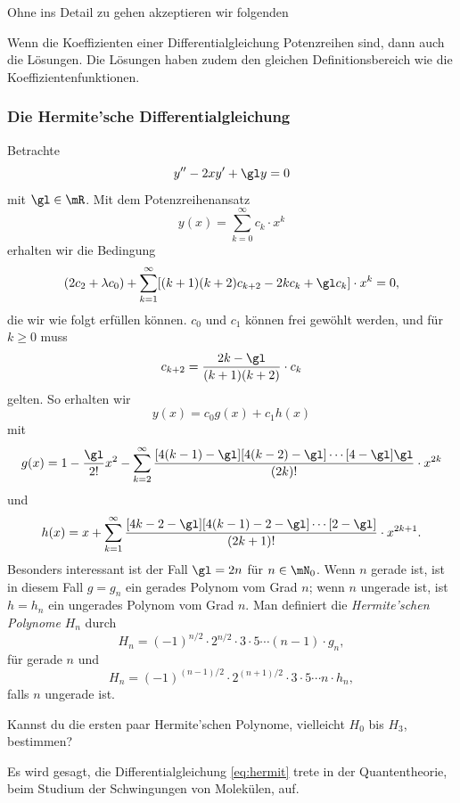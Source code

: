 \documentclass[%
11pt,%
twoside,%
titlepage,%
german,%
headsepline%
]{scrartcl}
\begin{document}
Ohne ins Detail zu gehen akzeptieren wir folgenden
\begin{satz}
Wenn
die Koeffizienten einer Differentialgleichung Potenzreihen sind, dann auch die L\"osungen. Die L\"osungen haben zudem den gleichen Definitionsbereich wie die Koeffizientenfunktionen.
\end{satz}

\subsubsection{Die Hermite'sche Differentialgleichung}

Betrachte
\begin{equation}\label{eq:hermit}
y''-2xy'+\gl y=0
\end{equation}
mit $\gl\in\mR$. Mit dem Potenzreihenansatz
$$y(x)=\sum_{k=0}^\infty c_k\cdot x^k$$
erhalten wir die Bedingung
$$
(2c_2+\lambda c_0)
+\sum_{k=1}^\infty[(k+1)(k+2)c_{k+2}-2kc_k+\gl c_k]\cdot x^k=0,
$$
die wir wie folgt erf\"ullen k\"onnen. $c_0$ und $c_1$ k\"onnen frei gew\"ohlt werden, und f\"ur $k\geq0$ muss
$$c_{k+2}=\frac{2k-\gl}{(k+1)(k+2)}\cdot c_k$$
gelten. So erhalten wir
$$y(x)=c_0g(x)+c_1h(x)$$
mit
$$
g(x)=1-\frac{\gl}{2!}x^2
-\sum_{k=2}^\infty\frac{[4(k-1)-\gl][4(k-2)-\gl]\dotsm[4-\gl]\gl}{(2k)!}\cdot x^{2k}
$$
und
$$
h(x)=x
+\sum_{k=1}^\infty\frac{[4k-2-\gl][4(k-1)-2-\gl]\dotsm[2-\gl]}{(2k+1)!}\cdot x^{2k+1}.
$$
Besonders interessant ist der Fall $\gl=2n$ f\"ur $n\in\mN_0$. Wenn $n$ gerade ist, ist in diesem Fall $g=g_n$ ein gerades Polynom vom Grad $n$; wenn $n$ ungerade ist, ist $h=h_n$ ein ungerades Polynom vom Grad $n$. Man definiert die \emph{Hermite'schen Polynome} $H_n$ durch
$$H_n=(-1)^{n/2}\cdot2^{n/2}\cdot3\cdot5\dotsm(n-1)\cdot g_n,$$
f\"ur gerade $n$ und
$$H_n=(-1)^{(n-1)/2}\cdot2^{(n+1)/2}\cdot3\cdot5\dotsm n\cdot h_n,$$
falls $n$ ungerade ist.

\begin{ueb}
Kannst du die ersten paar Hermite'schen Polynome, vielleicht $H_0$ bis $H_3$, bestimmen?
\end{ueb}

\begin{bem}
Es wird gesagt, die Differentialgleichung \eqref{eq:hermit} trete in der Quantentheorie, beim Studium der Schwingungen von Molek\"ulen, auf.
\end{bem}
\end{document}
